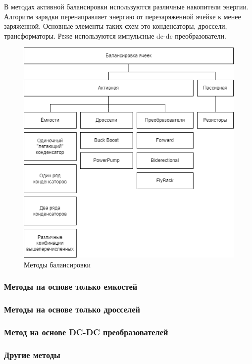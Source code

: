В методах активной балансировки используются различные накопители энергии.
Алгоритм зарядки перенаправляет энергию от перезаряженной ячейке к менее заряженной.
Основные элементы таких схем это конденсаторы, дроссели, трансформаторы. 
Реже используются импульсные dc-dc преобразователи.

\begin{figure}[h]
    \centering
    \includegraphics[width=0.6\linewidth]{img/classification.png}
    \caption{Методы балансировки}
    \label{fig:classification}
\end{figure}

\subsubsection{Методы на основе только емкостей}

\subsubsection{Методы на основе только дросселей}

\subsubsection{Метод на основе DC-DC преобразователей}

\subsubsection{Другие методы}